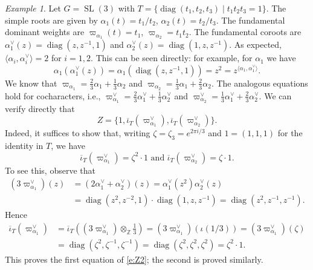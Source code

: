 \documentclass[reqno,11pt]{amsart}
\theoremstyle{remark}
\theoremstyle{remark}
\newtheorem{example}[Thm]{Example}
\theoremstyle{definition}
\theoremstyle{definition}
\theoremstyle{definition}
\numberwithin{equation}{section}
\newcommand{\Z}{\mathbb{ Z}}           %
\newcommand{\diag}{\operatorname{diag}}
\newcommand{\SL}{\operatorname{SL}}
\newcommand{\ga}{\alpha}
\def\ibarT{\overline{\iota}_T}
\begin{document}
\begin{example}
Let $G = \SL(3)$ with $T = \{ \diag(t_1, t_2, t_3) \mid t_1 t_2 t_3 = 1 \}$.  The simple roots are given by
$\ga_1 (t) = t_1/t_2$, $\ga_2(t) = t_2/t_3$.  The fundamental dominant weights are $\varpi_{\ga_1}(t) = t_1$, $\varpi_{\ga_2} = t_1 t_2$.  
The fundamental coroots are $\ga^{\vee}_1(z) = \diag(z, z^{-1}, 1)$ and $\ga^{\vee}_2(z) = \diag(1, z, z^{-1})$.  As expected, $\langle \ga_i, \ga_i^{\vee} \rangle = 2$ for $i=1,2$.
This can be seen directly: for example, for $\ga_1$ we have
$$
\ga_1(\ga^{\vee}_1(z)) = \ga_1( \diag(z, z^{-1}, 1)) = z^2 = z^{\langle \ga_1, \ga^{\vee}_1 \rangle}.
$$
We know that $ \varpi_{\ga_1}  = \frac{2}{3} \ga_1 + \frac{1}{3} \ga_2 $ and $\varpi_{\ga_2}  = \frac{1}{3} \ga_1 + \frac{2}{3} \ga_2$.  
The analogous equations hold for cocharacters, i.e.,  $\varpi^{\vee}_{\ga_1}  = \frac{2}{3} \ga^{\vee}_1 + \frac{1}{3} \ga^{\vee}_2$
and $\varpi^{\vee}_{\ga_2}  = \frac{1}{3} \ga^{\vee}_1 + \frac{2}{3} \ga^{\vee}_2$.
We can verify directly that
\begin{equation} \label{e:Z}
Z = \{1,  \ibarT(\varpi^{\vee}_{\ga_1} ) , \ibarT(\varpi^{\vee}_{\ga_2} ) \}.
\end{equation}
Indeed, it suffices to show that, writing $\zeta = \zeta_3 = e^{2 \pi i/3}$ and $1=(1,1,1)$ for the identity in $T$, we have
\begin{equation} \label{e:Z2}
\ibarT(\varpi^{\vee}_{\ga_1} ) = \zeta^2 \cdot 1 \mbox{   and   } \ibarT(\varpi^{\vee}_{\ga_2} )  = \zeta \cdot 1.
\end{equation}
To see this, observe that
\begin{align*}
(3\varpi^{\vee}_{\ga_1} )(z) & =  (2 \ga^{\vee}_1 + \ga^{\vee}_2) (z) = \ga^{\vee}_1(z^2) \ga^{\vee}_2 (z) \\
& = \diag(z^2, z^{-2}, 1) \cdot \diag(1, z, z^{-1}) = \diag(z^2, z^{-1}, z^{-1}).
\end{align*}
Hence 
\begin{align*}
\ibarT(\varpi^{\vee}_{\ga_1} )  & = \ibarT\left((3\varpi^{\vee}_{\ga_1} ) \otimes_{\Z} \frac{1}{3} \right) = (3\varpi^{\vee}_{\ga_1} ) (\iota(1/3))  = (3\varpi^{\vee}_{\ga_1} )(\zeta) \\ 
& = \diag(\zeta^2, \zeta^{-1}, \zeta^{-1}) = \diag(\zeta^2, \zeta^2, \zeta^2)  = \zeta^2 \cdot 1.
\end{align*}
This proves the first equation of \eqref{e:Z2}; the second is proved similarly.
\end{example}
\end{document}
